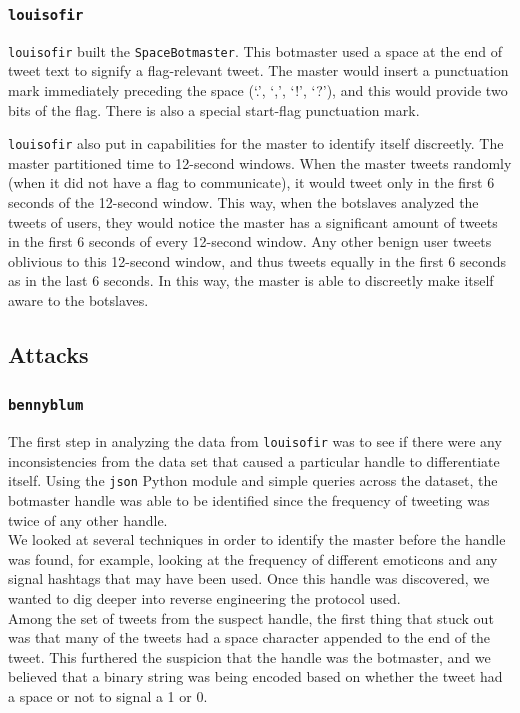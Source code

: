 \documentclass[11pt, oneside]{article} %
\numberwithin{equation}{section} %
\numberwithin{figure}{section} %
\numberwithin{table}{section} %
\renewcommand{\c}[1]{\texttt{#1}}
\newcommand{\teambb}{\c{bennyblum}}
\newcommand{\teamol}{\c{louisofir}}
\begin{document}
			
		\subsubsection{\teamol{}}
			\teamol{} built the \c{SpaceBotmaster}. This botmaster used a space at the end of tweet text to signify a flag-relevant tweet. The master would insert a punctuation mark immediately preceding the space (`.', `,', `!', `?'), and this would provide two bits of the flag. There is also a special start-flag punctuation mark. 

			\teamol{} also put in capabilities for the master to identify itself discreetly. The master partitioned time to 12-second windows. When the master tweets randomly (when it did not have a flag to communicate), it would tweet only in the first 6 seconds of the 12-second window. This way, when the botslaves analyzed the tweets of users, they would notice the master has a significant amount of tweets in the first 6 seconds of every 12-second window. Any other benign user tweets oblivious to this 12-second window, and thus tweets equally in the first 6 seconds as in the last 6 seconds. In this way, the master is able to discreetly make itself aware to the botslaves.

	\subsection{Attacks}
		\subsubsection{\teambb{}}
			The first step in analyzing the data from \teamol{} was to see if there were any inconsistencies from the data set that caused a particular handle to differentiate itself. Using the \c{json} Python module  and simple queries across the dataset, the botmaster handle was able to be identified since the frequency of tweeting was twice of any other handle. \\

			We looked at several techniques in order to identify the master before the handle was found, for example, looking at the frequency of different emoticons and any signal hashtags that may have been used. Once this handle was discovered, we wanted to dig deeper into reverse engineering the protocol used. \\

			Among the set of tweets from the suspect handle, the first thing that stuck out was that many of the tweets had a space character appended to the end of the tweet. This furthered the suspicion that the handle was the botmaster, and we believed that a binary string was being encoded based on whether the tweet had a space or not to signal a 1 or 0. \\
\end{document}

